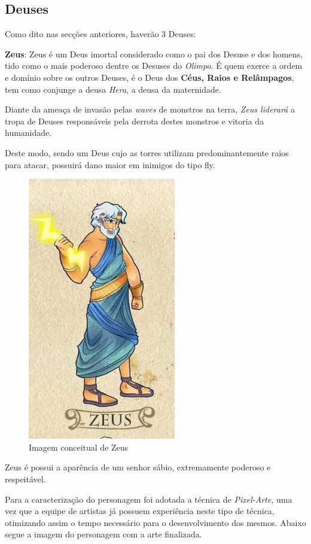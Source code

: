 \documentclass[11pt]{article} %
\begin{document}
\subsection{Deuses}
Como dito nas secções anteriores, haverão 3 Deuses:

{\large \textbf{Zeus}}: Zeus é um Deus imortal considerado como o pai dos Desuse e dos homens, tido como o mais poderoso dentre os Desuses do \textit{Olimpo}. É quem exerce a ordem e domínio sobre os outros Deuses, é o Deus dos \textbf{Céus, Raios e Relâmpagos}, tem como conjunge a deusa \textit{Hera}, a deusa da maternidade. 

Diante da ameaça de invasão pelas \textit{waves} de monstros na terra, \textit{Zeus liderará} a tropa de Deuses responsáveis pela derrota destes monstros e vitoria da humanidade. 

Deste modo, sendo um Deus cujo as torres utilizam predominantemente raios para atacar, possuirá dano maior em inimigos do tipo fly.
\begin{figure}[!htp]
\centering
\includegraphics[scale=0.25]{res/characters/zeus.png}
\caption{Imagem conceitual de Zeus}
\label{zeus}
\end{figure}

Zeus é possui a aparência de um senhor sábio, extremamente poderoso e respeitável.

Para a caracterização do personagem foi adotada a técnica de \textit{Pixel-Arte}, uma vez que a equipe de artistas já possuem experiência neste tipo de técnica, otimizando  assim o tempo necessário para o desenvolvimento dos mesmos. Abaixo segue a imagem do personagem com a arte finalizada.
\end{document}
